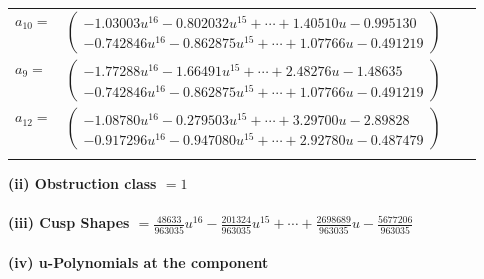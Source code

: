 \documentclass[1p]{elsarticle_modified}
\theoremstyle{definition}
\begin{document}
\begin{tabular}{m{7pt} m{180pt} m{7pt} m{180pt} }
\flushright $a_{10}=$&$\begin{pmatrix}-1.03003 u^{16}-0.802032 u^{15}+\cdots+1.40510 u-0.995130\\-0.742846 u^{16}-0.862875 u^{15}+\cdots+1.07766 u-0.491219\end{pmatrix}$ \\
\flushright $a_{9}=$&$\begin{pmatrix}-1.77288 u^{16}-1.66491 u^{15}+\cdots+2.48276 u-1.48635\\-0.742846 u^{16}-0.862875 u^{15}+\cdots+1.07766 u-0.491219\end{pmatrix}$ \\
\flushright $a_{12}=$&$\begin{pmatrix}-1.08780 u^{16}-0.279503 u^{15}+\cdots+3.29700 u-2.89828\\-0.917296 u^{16}-0.947080 u^{15}+\cdots+2.92780 u-0.487479\end{pmatrix}$\\&\end{tabular}
\flushleft \textbf{(ii) Obstruction class $= 1$}\\~\\
\flushleft \textbf{(iii) Cusp Shapes $= \frac{48633}{963035} u^{16}-\frac{201324}{963035} u^{15}+\cdots+\frac{2698689}{963035} u-\frac{5677206}{963035}$}\\~\\
\newpage\renewcommand{\arraystretch}{1}
\flushleft \textbf{(iv) u-Polynomials at the component}\newline \\
\end{document}
